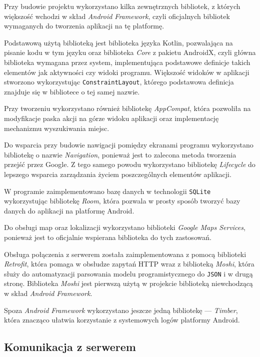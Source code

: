 \documentclass[polish,polish,a4paper,12pt]{article}
\begin{document}
	Przy budowie projektu wykorzystano kilka zewnętrznych bibliotek, z których większość wchodzi w skład \textit{Android Framework}, czyli oficjalnych bibliotek wymaganych do tworzenia aplikacji na tę platformę.

	Podstawową użytą biblioteką jest biblioteka języka Kotlin, pozwalająca na pisanie kodu w tym języku oraz biblioteka \textit{Core} z pakietu AndroidX, czyli główna biblioteka wymagana przez system, implementująca podstawowe definicje takich elementów jak aktywności czy widoki programu. Większość widoków w aplikacji stworzono wykorzystując \texttt{ConstraintLayout}, którego podstawowa definicja znajduje się w bibliotece o tej samej nazwie.

	Przy tworzeniu wykorzystano również bibliotekę \textit{AppCompat}, która pozwoliła na modyfikacje paska akcji na górze widoku aplikacji oraz implementację mechanizmu wyszukiwania miejsc.

	Do wsparcia przy budowie nawigacji pomiędzy ekranami programu wykorzystano bibliotekę o nazwie \textit{Navigation}, ponieważ jest to zalecona metoda tworzenia przejść przez Google. Z tego samego powodu wykorzystano bibliotekę \textit{Lifecycle} do lepszego wsparcia zarządzania życiem poszczególnych elementów aplikacji.

	W programie zaimplementowano bazę danych w technologii \texttt{SQLite} wykorzystując bibliotekę \textit{Room}, która pozwala w prosty sposób tworzyć bazy danych do aplikacji na platformę Android.

	Do obsługi map oraz lokalizacji wykorzystano biblioteki \textit{Google Maps Services}, ponieważ jest to oficjalnie wspierana biblioteka do tych zastosowań.

	Obsługa połączenia z serwerem została zaimplementowana z pomocą biblioteki \textit{Retrofit}, która pomaga w obsłudze zapytań HTTP wraz z biblioteką \textit{Moshi}, która służy do automatyzacji parsowania modelu programistycznego do \texttt{JSON} i w drugą stronę. Biblioteka \textit{Moshi} jest pierwszą użytą w projekcie biblioteką niewchodzącą w skład \textit{Android Framework}.

	Spoza \textit{Android Framework} wykorzystano jeszcze jedną bibliotekę — \textit{Timber}, która znacząco ułatwia korzystanie z systemowych logów platformy Android.

	\subsection{Komunikacja z serwerem}
\end{document}
